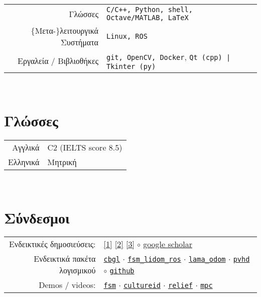 \documentclass[a4paper,10pt,twoside]{article}
\begin{document}
\begin{tabular}{rp{9cm}}
Γλώσσες                             & \texttt{C/C++, Python, shell, Octave/MATLAB, LaTeX} \\
$\{$Μετα-$\}$λειτουργικά Συστήματα  & \texttt{Linux, ROS} \\
  Εργαλεία / Βιβλιοθήκες            & \texttt{git, OpenCV, Docker}, \texttt{Qt (cpp) | Tkinter (py)}
\end{tabular} \\



\section{Γλώσσες}
\begin{tabular}{rp{12cm}}
Αγγλικά & C2 (IELTS score 8.5) \\
Ελληνικά & Μητρική
\end{tabular} \\


\section{Σύνδεσμοι}

\begin{tabular}{rp{12cm}}
  Ενδεικτικές δημοσιεύσεις: &
\href{https://ieeexplore.ieee.org/abstract/document/9981228}{[1]}
\href{https://www.sciencedirect.com/science/article/abs/pii/S0921889021002323}{[2]}
\href{https://www.tandfonline.com/doi/full/10.1080/00207179.2018.1514129}{[3]} $\circ$ \href{https://scholar.google.com/citations?view\_op=list\_works\&hl=en\&user=9\_hI4hMAAAAJ}{google scholar}\\

  Ενδεικτικά πακέτα λογισμικού&
\href{https://github.com/li9i/cbgl}{\texttt{cbgl}} $\cdot$
\href{https://github.com/li9i/fsm\_lidom\_ros}{\texttt{fsm\_lidom\_ros}} $\cdot$
\href{https://github.com/li9i/lama\_odom}{\texttt{lama\_odom}} $\cdot$
\href{https://github.com/li9i/pandora\_vision\_2014/tree/hydro-devel/pandora\_vision\_hole\_detector}{\texttt{pvhd}} $\circ$ \href{https://github.com/li9i}{\texttt{github}}\\

  Demos / videos: & \href{https://www.youtube.com/watch?v=hB4qsHCEXGI}{\texttt{fsm}} $\cdot$ \href{https://cultureid.web.auth.gr/?page\_id=200&lang=en}{\texttt{cultureid}} $\cdot$ \href{https://relief.web.auth.gr/}{\texttt{relief}} $\cdot$ \href{https://www.youtube.com/watch?v=937OZez1iN8}{\texttt{mpc}}
\end{tabular}
\\
\end{document}
